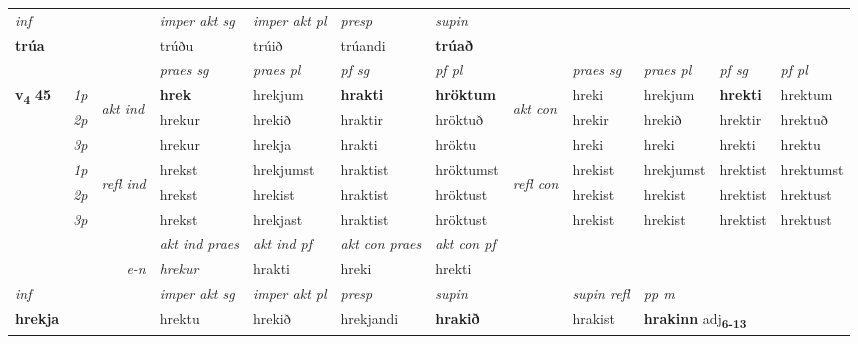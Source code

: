 \begin{longtable}[l]{X>{\footnotesize\itshape}llXXXXlXXXX}
   {\textit{inf}} & &  & \textit{imper akt sg} & \textit{imper akt pl}   & \textit{presp} & \textit{supin}   \\*
  {\textbf{trúa}} & && trúðu  & trúið   & trúandi &  \textbf{trúað}   \\*

\midrule

 & &   & \textit{praes sg}  & \textit{praes pl}    & \textit{ pf sg} & \textit{pf pl} & & \textit{praes sg}  & \textit{praes pl}    & \textit{pf sg} & \textit{pf pl }  \\ \cmidrule{4-7} \cmidrule{9-12}
 \multirow{2}{*}{{{\textbf{v{\textsubscript{4}}} \Large{\textbf{45}}}}}  & 1p & \multirow{3}{*}{\begin{turn}{90}\textit{akt ind}\end{turn}} & \textbf{hrek} & hrekjum & \textbf{hrakti} & \textbf{hröktum} & \multirow{3}{*}{\begin{turn}{90}\textit{akt con}\end{turn}} &hreki & hrekjum & \textbf{hrekti} & hrektum\\*
 & 2p &  &  hrekur  & hrekið & hraktir & hröktuð & & hrekir & hrekið & hrektir & hrektuð \\*
 & 3p &  & hrekur & hrekja & hrakti & hröktu & & hreki & hreki& hrekti & hrektu \\*
\cmidrule{4-7} \cmidrule{9-12}
 & 1p & \multirow{3}{*}{\begin{turn}{90}\textit{refl ind}\end{turn}}  & hrekst & hrekjumst & hraktist & hröktumst & \multirow{3}{*}{\begin{turn}{90}\textit{refl con}\end{turn}}  &hrekist & hrekjumst & hrektist & hrektumst \\*
 & 2p &  & hrekst & hrekist & hraktist & hröktust & &hrekist & hrekist & hrektist & hrektust \\*
 & 3p  & & hrekst & hrekjast & hraktist & hröktust & & hrekist & hrekist& hrektist & hrektust \\*
\cmidrule{4-7} \cmidrule{9-12}

   && &  \textit{akt ind praes} & \textit{akt ind pf} & \textit{akt con praes} & \textit{akt con pf} \\*
\multicolumn{3}{r}{\textit{e-n}} & hrekur & hrakti & hreki & hrekti \\*

\cmidrule{4-7}
   {\textit{inf}} & &  & \textit{imper akt sg} & \textit{imper akt pl}   & \textit{presp} & \textit{supin} && \textit{supin refl} & \textit{pp m} \\*
  {\textbf{hrekja}} & && hrektu  & hrekið   & hrekjandi &  \textbf{hrakið} && hrakist & \multicolumn{2}{l}{\textbf{hrakinn} adj\textbf{\textsubscript{6-13}}} \\*


\end{longtable}
